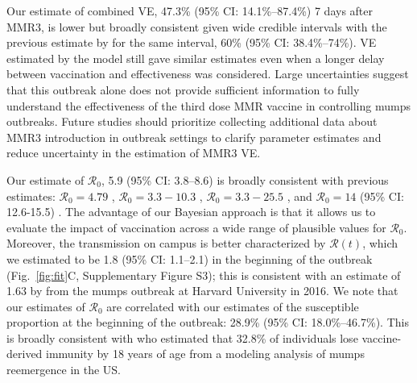 \documentclass[12pt]{article}
\newcommand{\fref}[1]{Fig.~\ref{fig:#1}}
\begin{document}
Our estimate of combined VE, 47.3\% (95\% CI: 14.1\%--87.4\%) 7 days after MMR3, is lower but broadly consistent given wide credible intervals with the previous estimate by \cite{cardemil2017effectiveness} for the same interval, 60\% (95\% CI: 38.4\%--74\%).
VE estimated by the model still gave similar estimates even when a longer delay between vaccination and effectiveness was considered.
Large uncertainties suggest that this outbreak alone does not provide sufficient information to fully understand the effectiveness of the third dose MMR vaccine in controlling mumps outbreaks.
Future studies should prioritize collecting additional data about MMR3 introduction in outbreak settings to clarify parameter estimates and reduce uncertainty in the estimation of MMR3 VE.

Our estimate of $\mathcal R_0$, 5.9 (95\% CI: 3.8--8.6) is broadly consistent with previous estimates: $\mathcal R_0=4.79$  \citep{lewnard2018vaccine}, $\mathcal R_0=3.3-10.3$ \citep{edmunds2000pre}, $\mathcal R_0=3.3-25.5$ \citep{farrington2001estimation}, and $\mathcal R_0=14$ (95\% CI: 12.6-15.5) \citep{gokhale2023disentangling}.
The advantage of our Bayesian approach is that it allows us to evaluate the impact of vaccination across a wide range of plausible values for $\mathcal R_0$.
Moreover, the transmission on campus is better characterized by $\mathcal R (t)$, which we estimated to be 1.8 (95\% CI: 1.1--2.1) in the beginning of the outbreak (\fref{fit}C, Supplementary Figure S3);
this is consistent with an estimate of 1.63 by \cite{shah2022containing} from the mumps outbreak at Harvard University in 2016.
We note that our estimates of $\mathcal R_0$ are correlated with our estimates of the susceptible proportion at the beginning of the outbreak: 28.9\% (95\% CI: 18.0\%--46.7\%).
This is broadly consistent with \cite{gokhale2023disentangling} who estimated that 32.8\% of individuals lose vaccine-derived immunity by 18 years of age from a modeling analysis of mumps reemergence in the US.
\end{document}
